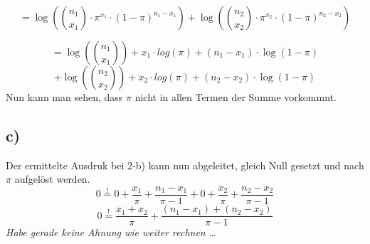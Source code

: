 \[ = \log\left({n_1 \choose x_1} \cdot \pi^{x_1} \cdot (1-\pi)^{n_1-x_1}\right)
   + \log\left({n_2 \choose x_2} \cdot \pi^{x_2} \cdot (1-\pi)^{n_2-x_2}\right)   \]

\[ = \log\left( {n_1 \choose x_1} \right) + x_1 \cdot log(\pi) +
     (n_1-x_1) \cdot \log(1-\pi) \]
\[ + \log\left( {n_2 \choose x_2} \right) + x_2 \cdot log(\pi) +
     (n_2-x_2) \cdot \log(1-\pi) \]
Nun kann man sehen, dass $\pi$ nicht in allen Termen der Summe vorkommnt.

\subsection*{c)}
Der ermittelte Ausdruk bei 2-b) kann nun abgeleitet, gleich Null gesetzt
und nach $\pi$ aufgelöst werden.
\[ 0 \stackrel{!}{=} 0 + \frac{x_1}{\pi} + \frac{n_1-x_1}{\pi-1}
   + 0 + \frac{x_2}{\pi} + \frac{n_2-x_2}{\pi-1} \]
\[ 0 \stackrel{!}{=} \frac{x_1+x_2}{\pi} + \frac{(n_1-x_1)+(n_2-x_2)}{\pi-1} \]
\emph{Habe gerade keine Ahnung wie weiter rechnen \ldots}



